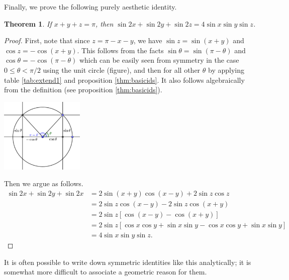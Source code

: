 \documentclass[a4paper,leqno]{article}
\numberwithin{equation}{section}
\newtheorem{thm}[equation]{Theorem}
\theoremstyle{definition}
\theoremstyle{remark}
\begin{document}
Finally, we prove the following purely aesthetic identity.
\begin{thm}
  If $ x + y + z = \pi $, then $ \sin 2x + \sin 2y + \sin 2z = 4\sin x \sin y \sin z $.
\end{thm}
\begin{proof}
  First, note that since $ z = \pi - x - y $, we have $ \sin z = \sin(x + y) $ and $ \cos z = -\cos(x + y) $. This follows
  from the facts $ \sin \theta = \sin(\pi - \theta) $ and $ \cos \theta = -\cos(\pi - \theta) $ which can be easily seen
  from symmetry in the case $ 0 \leq \theta < \pi/2 $ using the unit circle (figure), and then for all other $ \theta $ by
  applying table \ref{tab:extend1} and proposition \ref{thm:basicids}. It also follows algebraically from the definition
  (see proposition \ref{thm:basicids}).
  \begin{center}
    \includegraphics[width=0.3\textwidth]{piminus}
  \end{center}
  Then we argue as follows.
  \begin{align*}
    \sin 2x + \sin 2y + \sin 2x &= 2\sin(x + y)\cos(x - y) + 2\sin z \cos z\\
                                &= 2\sin z \cos(x - y) - 2\sin z \cos(x + y)\\
                                &= 2\sin z [\cos(x - y) - \cos(x + y)]\\
                                &= 2\sin z [\cos x \cos y + \sin x \sin y - \cos x \cos y + \sin x \sin y]\\
                                &= 4\sin x \sin y \sin z.
  \end{align*}
\end{proof}

It is often possible to write down symmetric identities like this analytically; it is somewhat
more difficult to associate a geometric reason for them.
\end{document}
